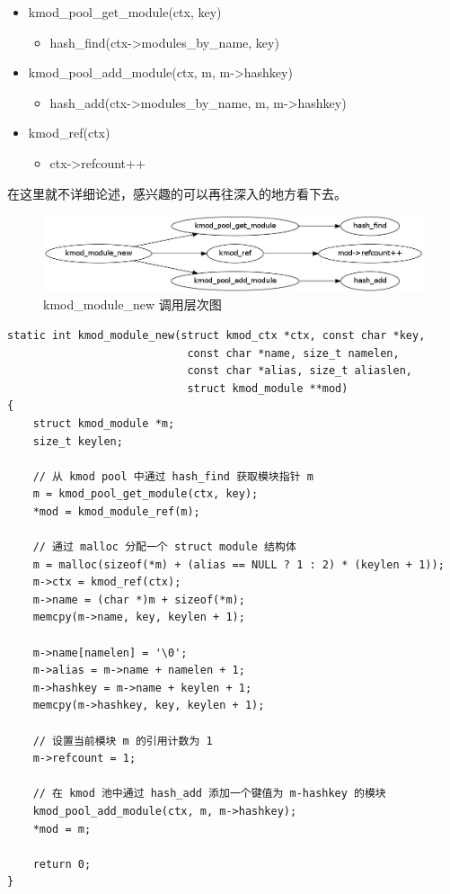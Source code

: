 \documentclass[11pt,a4paper]{article}
\makeatletter
\def\maxwidth{\ifdim\Gin@nat@width>\linewidth\linewidth
\else\Gin@nat@width\fi}
\let\Oldincludegraphics\includegraphics
\renewcommand{\includegraphics}[1]{\Oldincludegraphics[width=\maxwidth]{#1}}
\makeatother
\begin{document}
\begin{itemize}
\item
  kmod\_pool\_get\_module(ctx, key)
  \begin{itemize}
  \item
    hash\_find(ctx-\textgreater{}modules\_by\_name, key)
  \end{itemize}
\item
  kmod\_pool\_add\_module(ctx, m, m-\textgreater{}hashkey)
  \begin{itemize}
  \item
    hash\_add(ctx-\textgreater{}modules\_by\_name, m,
    m-\textgreater{}hashkey)
  \end{itemize}
\item
  kmod\_ref(ctx)
  \begin{itemize}
  \item
    ctx-\textgreater{}refcount++
  \end{itemize}
\end{itemize}
在这里就不详细论述，感兴趣的可以再往深入的地方看下去。

\begin{figure}[htbp]
\centering
\includegraphics{./figures/kmod_module_new.jpg}
\caption{kmod\_module\_new 调用层次图}
\end{figure}

{\begin{shaded}\begin{verbatim}
static int kmod_module_new(struct kmod_ctx *ctx, const char *key,
                            const char *name, size_t namelen,
                            const char *alias, size_t aliaslen,
                            struct kmod_module **mod)
{
    struct kmod_module *m;
    size_t keylen;

    // 从 kmod pool 中通过 hash_find 获取模块指针 m
    m = kmod_pool_get_module(ctx, key);
    *mod = kmod_module_ref(m);

    // 通过 malloc 分配一个 struct module 结构体
    m = malloc(sizeof(*m) + (alias == NULL ? 1 : 2) * (keylen + 1));
    m->ctx = kmod_ref(ctx);
    m->name = (char *)m + sizeof(*m);
    memcpy(m->name, key, keylen + 1);

    m->name[namelen] = '\0';
    m->alias = m->name + namelen + 1;
    m->hashkey = m->name + keylen + 1;
    memcpy(m->hashkey, key, keylen + 1);

    // 设置当前模块 m 的引用计数为 1
    m->refcount = 1;

    // 在 kmod 池中通过 hash_add 添加一个键值为 m-hashkey 的模块
    kmod_pool_add_module(ctx, m, m->hashkey);
    *mod = m;

    return 0;
}
\end{verbatim}\end{shaded}}
\end{document}
